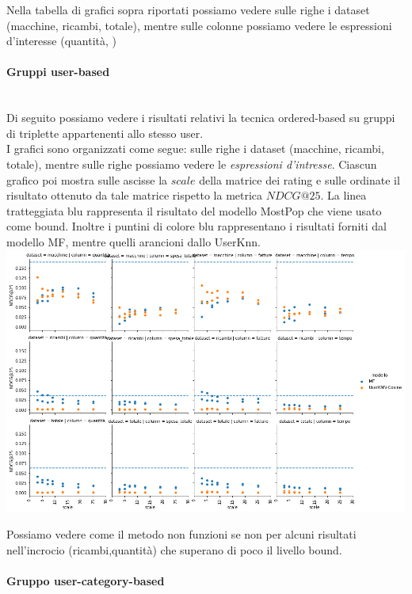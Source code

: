 Nella tabella di grafici sopra riportati possiamo vedere sulle righe i dataset (macchine, ricambi, totale), mentre sulle colonne possiamo vedere le espressioni d'interesse (quantità, )

\paragraph{Gruppi user-based}\mbox{} \\
Di seguito possiamo vedere i risultati relativi la tecnica ordered-based su gruppi di triplette appartenenti allo stesso user.\\
I grafici sono organizzati come segue: sulle righe i dataset (macchine, ricambi, totale), mentre sulle righe possiamo vedere le \textit{espressioni d'intresse}. Ciascun grafico poi mostra sulle ascisse la $scale$ della matrice dei rating e sulle ordinate il risultato ottenuto da tale matrice rispetto la metrica $NDCG@25$. La linea tratteggiata blu rappresenta il risultato del modello MostPop che viene usato come bound.
Inoltre i puntini di colore blu rappresentano i risultati forniti dal modello MF, mentre quelli arancioni dallo UserKnn.\\

\includegraphics[width=16cm]{figures/risultati_ordered_singolo.png}

Possiamo vedere come il metodo non funzioni se non per alcuni risultati nell'incrocio (ricambi,quantità) che superano di poco il livello bound.

\paragraph{Gruppo user-category-based}\mbox{} \\


